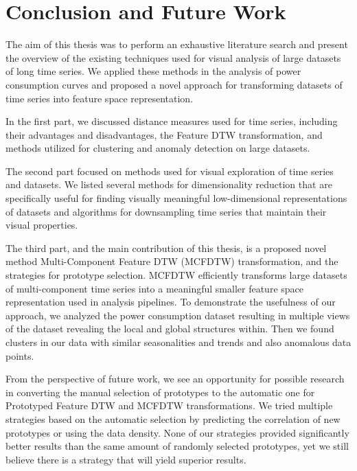 \chapter{Conclusion and Future Work}
The aim of this thesis was to perform an exhaustive literature search and present the overview of the existing techniques used for visual analysis of large datasets of long time series. We applied these methods in the analysis of power consumption curves and proposed a novel approach for transforming datasets of time series into feature space representation.

In the first part, we discussed distance measures used for time series, including their advantages and disadvantages, the Feature DTW transformation, and methods utilized for clustering and anomaly detection on large datasets.

The second part focused on methods used for visual exploration of time series and datasets. We listed several methods for dimensionality reduction that are specifically useful for finding visually meaningful low-dimensional representations of datasets and algorithms for downsampling time series that maintain their visual properties.

The third part, and the main contribution of this thesis, is a proposed novel method Multi-Component Feature DTW (MCFDTW) transformation, and the strategies for prototype selection. MCFDTW efficiently transforms large datasets of multi-component time series into a meaningful smaller feature space representation used in analysis pipelines. To demonstrate the usefulness of our approach, we analyzed the power consumption dataset resulting in multiple views of the dataset revealing the local and global structures within. Then we found clusters in our data with similar seasonalities and trends and also anomalous data points.

From the perspective of future work, we see an opportunity for possible research in converting the manual selection of prototypes to the automatic one for Prototyped Feature DTW and MCFDTW transformations. We tried multiple strategies based on the automatic selection by predicting the correlation of new prototypes or using the data density. None of our strategies provided significantly better results than the same amount of randomly selected prototypes, yet we still believe there is a strategy that will yield superior results.